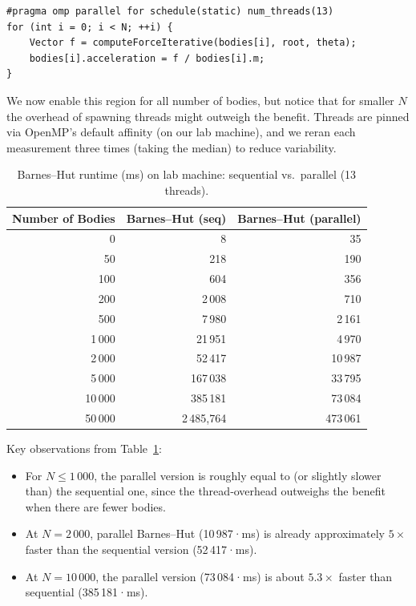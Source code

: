 \documentclass{article}
\begin{document}
\begin{verbatim}
#pragma omp parallel for schedule(static) num_threads(13)
for (int i = 0; i < N; ++i) {
    Vector f = computeForceIterative(bodies[i], root, theta);
    bodies[i].acceleration = f / bodies[i].m;
}
\end{verbatim}

We now enable this region for all number of bodies, but notice that for smaller \(N\) the overhead of spawning threads might outweigh the benefit. Threads are pinned via OpenMP’s default affinity (on our lab machine), and we reran each measurement three times (taking the median) to reduce variability.  


\begin{table}[H]
    \centering
    \begin{tabular}{|r|r|r|}
    \hline
    \textbf{Number of Bodies} & \textbf{Barnes–Hut (seq)} & \textbf{Barnes–Hut (parallel)} \\
    \hline
    0      &       8   &       35    \\ 
    50     &     218   &     190    \\ 
    100    &     604   &     356    \\ 
    200    &   2\,008  &   710   \\ 
    500    &   7\,980  &   2\,161   \\ 
    1\,000 &  21\,951  &  4\,970   \\ 
    2\,000 &  52\,417  &  10\,987   \\ 
    5\,000 & 167\,038  &  33\,795   \\ 
    10\,000& 385\,181  &  73\,084   \\ 
    50\,000& 2\,485,764  &  473\,061   \\ 
    \hline
    \end{tabular}
    \caption{Barnes–Hut runtime (ms) on lab machine: sequential vs.\ parallel (13 threads).}
    \label{tab:bh_seq_vs_par}
\end{table}

\noindent
Key observations from Table~\ref{tab:bh_seq_vs_par}:
\begin{itemize}
  \item For $N \le 1\,000$, the parallel version is roughly equal to (or slightly slower than) the sequential one, since the thread‐overhead outweighs the benefit when there are fewer bodies.
  \item At $N = 2\,000$, parallel Barnes–Hut (10\,987·ms) is already approximately $5\times$ faster than the sequential version (52\,417·ms).
  \item At $N = 10\,000$, the parallel version (73\,084·ms) is about $5.3\times$ faster than sequential (385\,181·ms).
\end{itemize}
\end{document}
